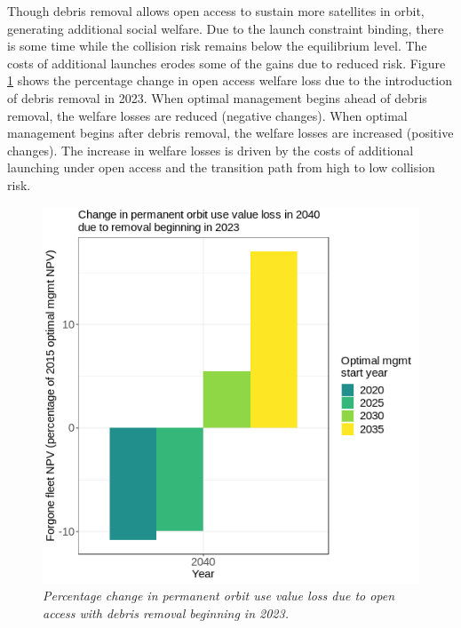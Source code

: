 \documentclass[12pt]{article}
\begin{document}
Though debris removal allows open access to sustain more satellites in orbit, generating additional social welfare. Due to the launch constraint binding, there is some time while the collision risk remains below the equilibrium level. The costs of additional launches erodes some of the gains due to reduced risk. Figure \ref{coi_removal} shows the percentage change in open access welfare loss due to the introduction of debris removal in 2023. When optimal management begins ahead of debris removal, the welfare losses are reduced (negative changes). When optimal management begins after debris removal, the welfare losses are increased (positive changes). The increase in welfare losses is driven by the costs of additional launching under open access and the transition path from high to low collision risk.

\begin{figure}[H]
	\centering
	\includegraphics[width=\textwidth]{../../images/remcomp_7_starts_percent_change_in_welf_loss_2006_remfrac_05_remstart_2023.png}
	\captionsetup{format=hang}
	\caption[Change in open access welfare loss due to debris removal in 2023]{\textit{Percentage change in permanent orbit use value loss due to open access with debris removal beginning in 2023.}
	}
	\label{coi_removal}
\end{figure}
\end{document}
